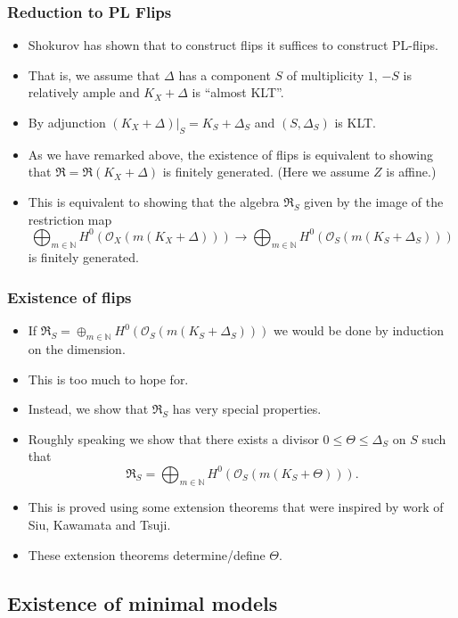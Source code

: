 \documentclass{beamer}
\theoremstyle{plain}
\theoremstyle{definition}
\theoremstyle{remark}
\def\OO{\mathcal {O}}
\begin{document}
\begin{frame}
\frametitle{Reduction to PL Flips}
\begin{itemize}
\item Shokurov has shown that to construct flips it suffices to construct PL-flips.
\pause
\item That is, we assume that $\Delta$ has a component $S$ of multiplicity $1$, $-S$ is relatively ample and $K_X+\Delta$ is ``almost KLT''.
\pause
\item By adjunction $(K_X+\Delta )|_S=K_S+\Delta _S$ and $(S,\Delta _S)$ is KLT. 
\pause
\item As we have remarked above, the existence of flips is equivalent to showing that $\mathfrak {R}=\mathfrak {R}(K_X+\Delta )$
is finitely generated. (Here we assume $Z$ is affine.)
\pause
\item This is equivalent to showing that the algebra
$\mathfrak {R}_S$ given by the image of the restriction map
$$\bigoplus _{m\in \mathbb{N}}H^0(\OO _X(m(K_X+\Delta )))\to 
\bigoplus _{m\in \mathbb{N}}H^0(\OO _S(m(K_S+\Delta _S)))$$
is finitely generated.
\end{itemize}
\end{frame}


\begin{frame}
 \frametitle{Existence of flips}
\begin{itemize}
\item If $\mathfrak {R}_S=\oplus _{m\in \mathbb{N}}H^0(\OO _S(m(K_S+\Delta _S)))$ we would be done by induction on the dimension.
\pause
\item This is too much to hope for.
\pause
\item Instead, we show that $\mathfrak {R}_S$ has very special properties.
\pause
\item Roughly speaking we show that there exists a divisor $0\leq \Theta \leq \Delta _S$ on $S$ such that
$$\mathfrak {R}_S=\bigoplus _{m\in \mathbb{N}}H^0(\OO _S(m(K_S+\Theta))).$$
\pause
\item This is proved using some extension theorems that were inspired by work of Siu, Kawamata and Tsuji.
\pause
\item These extension theorems determine/define $\Theta$.
\end{itemize}
\end{frame}
\subsection{Existence of minimal models}
\end{document}
